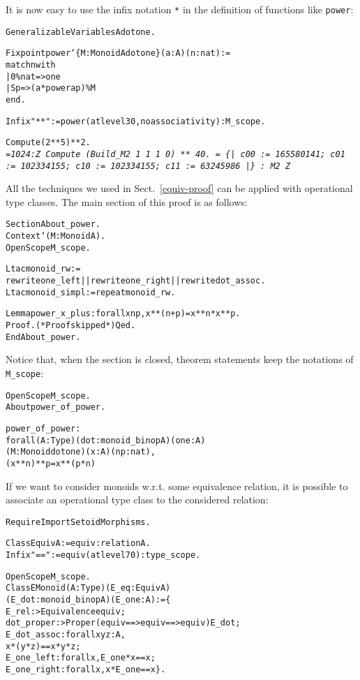 \documentclass[a4]{report}
\begin{document}
It is now easy to use the infix notation \texttt{*} in the definition of
functions like \texttt{power}:
\begin{alltt}
Generalizable Variables A dot one.

Fixpoint power `\{M : Monoid A dot one\}(a:A)(n:nat) :=
  match n with 
  | 0\%nat => one
  | S p => (a * power a p)\%M
  end.

Infix "**" := power (at level 30, no associativity):M_scope.

Compute  (2 ** 5) ** 2.\it
= 1024 :Z\tt
Compute (Build_M2  1 1 1  0) ** 40.\it
    = \{|
       c00 := 165580141;
       c01 := 102334155;
       c10 := 102334155;
       c11 := 63245986 |\}
     : M2 Z
\end{alltt}


All the techniques we used in Sect.~\ref{equiv-proof} can be applied with
operational type classes. The main section of this proof is as follows:

\begin{alltt}
Section About_power.
  Context `(M:Monoid A).
  Open Scope M_scope.
  
  Ltac monoid_rw :=
    rewrite one_left || rewrite one_right || rewrite dot_assoc.
  Ltac monoid_simpl := repeat monoid_rw.

  Lemma power_x_plus : forall x n p, x ** (n + p) = x ** n * x ** p.
  Proof. (* Proof skipped *) Qed.
End About_power.
\end{alltt}

Notice that, when the section is closed, theorem statements keep the
notations of \texttt{M\_scope}:

\begin{alltt}
Open Scope M_scope.
About power_of_power.\it\color{red}

power_of_power :
forall (A : Type) (dot : monoid_binop A) (one : A) 
  (M : Monoid dot one) (x : A) (n p : nat), 
        (x ** n) ** p = x ** (p * n)
\end{alltt}


If we want to consider monoids w.r.t. some equivalence relation, 
it is possible to associate an operational type class to the considered relation:

\begin{alltt}
Require Import Setoid Morphisms.

Class Equiv A := equiv : relation A.
Infix "==" := equiv (at level 70):type_scope.

Open Scope M_scope.
Class EMonoid (A:Type)(E_eq :Equiv A)
              (E_dot : monoid_binop A)(E_one : A):= \{
  E_rel :> Equivalence equiv; 
  dot_proper :> Proper (equiv ==> equiv ==> equiv) E_dot; 
  E_dot_assoc : forall x y z:A,
      x * (y * z) == x * y * z;
  E_one_left : forall x, E_one * x == x;
  E_one_right : forall x, x * E_one == x\}.
\end{alltt}
\end{document}
